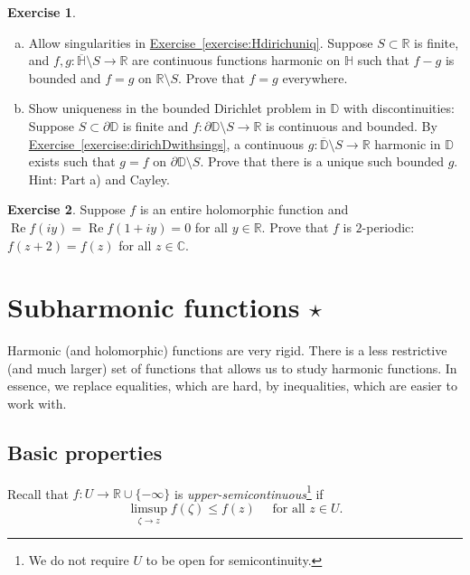 \documentclass[12pt,openany]{book}
\renewcommand{\Re}{\operatorname{Re}}
\newcommand{\C}{{\mathbb{C}}}
\newcommand{\R}{{\mathbb{R}}}
\newcommand{\D}{{\mathbb{D}}}
\newcommand{\bH}{{\mathbb{H}}}
\newcommand{\myindex}[1]{#1\index{#1}}
\theoremstyle{plain}
\theoremstyle{remark}
\theoremstyle{definition}
\newenvironment{exbox}{%
    \def\FrameCommand{\vrule width 1pt \relax\hspace{10pt}}%
    \MakeFramed{\advance\hsize-\width\FrameRestore}%
}{%
    \endMakeFramed
}
\newenvironment{exparts}{%
    \leavevmode\begin{enumerate}[a),noitemsep,topsep=0pt,parsep=0pt,partopsep=0pt]
}{%
    \end{enumerate}
}
\theoremstyle{exercise}
\newtheorem{exercise}{Exercise}[section]
\theoremstyle{example}
\newcommand{\exerciseref}[1]{\hyperref[#1]{Exercise~\ref*{#1}}}
\begin{document}
\begin{exbox}
\begin{exercise}
\begin{exparts}
\item
Allow singularities in \exerciseref{exercise:Hdirichuniq}.
Suppose $S \subset \R$ is finite, and
$f,g \colon \overline{\bH} \setminus S \to \R$ are 
continuous functions harmonic on $\bH$ such that $f-g$ is bounded and
$f=g$ on $\R \setminus S$.  Prove that $f=g$ everywhere.
\item
Show uniqueness in the bounded Dirichlet problem in $\D$ with
discontinuities:  Suppose $S \subset \partial \D$ is finite and
$f \colon \partial \D \setminus S \to \R$ is continuous and bounded.
By \exerciseref{exercise:dirichDwithsings}, a continuous $g \colon
\overline{\D} \setminus S \to \R$ harmonic in $\D$ exists such that $g=f$ on
$\partial \D \setminus S$.  Prove that there is a unique such bounded $g$.
Hint: Part a) and Cayley.
\end{exparts}
\end{exercise}

\begin{exercise}
Suppose $f$ is an entire holomorphic function and
$\Re f(iy) = \Re f(1+iy) = 0$ for all $y \in \R$.  Prove
that $f$ is $2$-periodic: $f(z+2)=f(z)$ for all $z \in \C$.
\end{exercise}
\end{exbox}


\section{Subharmonic functions \texorpdfstring{$\star$}{*}}
\label{sec:subharmonic}

Harmonic (and holomorphic) functions are very rigid.
There is a less restrictive (and much larger) set of functions that allows
us to study harmonic functions.  In essence, we replace equalities, which are
hard, by inequalities, which are easier to work with.

\subsection{Basic properties}

Recall that $f \colon U \to \R \cup \{ -\infty \}$
is \emph{\myindex{upper-semicontinuous}}\footnote{%
We do not require $U$ to be open for semicontinuity.}
if 
\begin{equation*}
\limsup_{\zeta \to z} f(\zeta) \leq f(z) \quad \text{ for all } z \in U.
\end{equation*}
\end{document}
